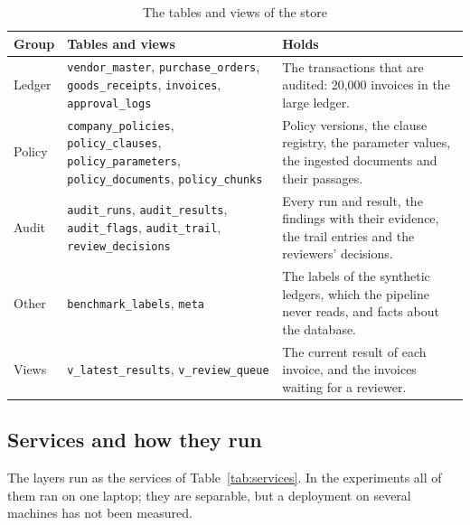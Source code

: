 \documentclass[11pt,a4paper]{article}
\begin{document}
\begin{table}[htbp]
\caption{The tables and views of the store}
\label{tab:data}
\centering
\small
\begin{tabular}{L{2.3cm}L{6.2cm}L{6.8cm}}
\toprule
Group & Tables and views & Holds \\
\midrule
Ledger & \texttt{vendor\_master}, \texttt{purchase\_orders}, \texttt{goods\_receipts}, \texttt{invoices}, \texttt{approval\_logs} & The transactions that are audited: 20,000 invoices in the large ledger. \\
Policy & \texttt{company\_policies}, \texttt{policy\_clauses}, \texttt{policy\_parameters}, \texttt{policy\_documents}, \texttt{policy\_chunks} & Policy versions, the clause registry, the parameter values, the ingested documents and their passages. \\
Audit & \texttt{audit\_runs}, \texttt{audit\_results}, \texttt{audit\_flags}, \texttt{audit\_trail}, \texttt{review\_decisions} & Every run and result, the findings with their evidence, the trail entries and the reviewers' decisions. \\
Other & \texttt{benchmark\_labels}, \texttt{meta} & The labels of the synthetic ledgers, which the pipeline never reads, and facts about the database. \\
Views & \texttt{v\_latest\_results}, \texttt{v\_review\_queue} & The current result of each invoice, and the invoices waiting for a reviewer. \\
\bottomrule
\end{tabular}
\end{table}

\subsection{Services and how they run}
The layers run as the services of Table~\ref{tab:services}. In the experiments all of them ran on one laptop; they are separable, but a deployment on several machines has not been measured.
\end{document}

